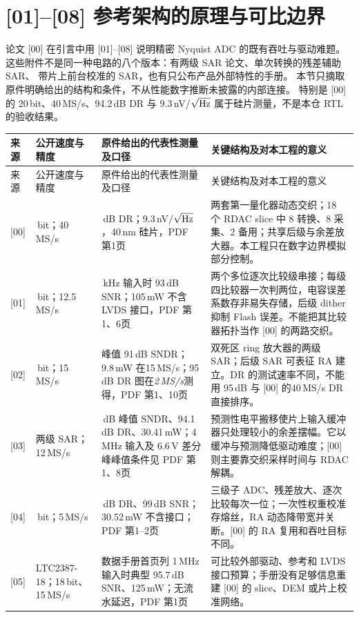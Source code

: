 \section{[01]--[08] 参考架构的原理与可比边界}
\label{sec:prior-art-comparison}
论文 [00] 在引言中用 [01]--[08] 说明精密 Nyquist ADC 的既有吞吐与驱动难题。
这些附件不是同一种电路的八个版本：有两级 SAR 论文、单次转换的残差辅助 SAR、
带片上前台校准的 SAR，也有只公布产品外部特性的手册。
本节只摘取原件明确给出的结构和条件，不从性能数字推断未披露的内部连接。
特别是 [00] 的 20\,bit、40\,MS/s、94.2\,dB DR 与 9.3\,nV/$\sqrt{\rm Hz}$
属于硅片测量，不是本仓 RTL 的验收结果。

\small
\begin{longtable}{>{\raggedright\arraybackslash}p{11mm}>{\raggedright\arraybackslash}p{32mm}>{\raggedright\arraybackslash}p{47mm}>{\raggedright\arraybackslash}p{58mm}}
\toprule 来源&公开速度与精度&原件给出的代表性测量及口径&关键结构及对本工程的意义\\\midrule\endfirsthead
\toprule 来源&公开速度与精度&原件给出的代表性测量及口径&关键结构及对本工程的意义\\\midrule\endhead
\mbox{[00]}&20\,bit；40\,MS/s&94.2\,dB DR；9.3\,nV/$\sqrt{\rm Hz}$，40\,nm 硅片，PDF 第1页&两套第一量化器动态交织；18 个 RDAC slice 中 8 转换、8 采集、2 备用；共享后级与余差放大器。本工程只在数字边界模拟部分控制。\tabularnewline
\mbox{[01]}&18\,bit；12.5\,MS/s&50\,kHz 输入时 93\,dB SNR；105\,mW 不含 LVDS 接口，PDF 第1、6页&两个多位逐次比较级串接；每级四比较器一次判两位，电容误差系数存非易失存储，后级 dither 抑制 Flash 误差。不能把其比较器拓扑当作 [00] 的两路交织。\tabularnewline
\mbox{[02]}&16\,bit；15\,MS/s&峰值 91\,dB SNDR；9.8\,mW 在15\,MS/s；95\,dB DR 图在\emph{2\,MS/s}测得，PDF 第1、10页&双死区 ring 放大器的两级 SAR；后级 SAR 可表征 RA 建立。DR 的测试速率不同，不能用 95\,dB 与 [00] 的40\,MS/s DR 直接排序。\tabularnewline
\mbox{[03]}&两级 SAR；12\,MS/s&91.3\,dB 峰值 SNDR、94.1\,dB DR、30.41\,mW；4\,MHz 输入及 6.6\,V 差分峰峰值条件见 PDF 第1、8页&预测性电平搬移使片上输入缓冲器只处理较小的余差摆幅。它以缓冲与预测降低驱动难度；[00] 则主要靠交织采样时间与 RDAC 解耦。\tabularnewline
\mbox{[04]}&18\,bit；5\,MS/s&100.2\,dB DR、99\,dB SNR；30.52\,mW 不含接口；PDF 第1--2页&三级子 ADC、残差放大、逐次比较每次一位；一次性权重校准存熔丝，RA 动态降带宽并关断。[00] 的 RA 复用和吞吐目标不同。\tabularnewline
\mbox{[05]}&LTC2387-18；18\,bit、15\,MS/s&数据手册首页列 1\,MHz 输入时典型 95.7\,dB SNR、125\,mW；无流水延迟，PDF 第1页&可比较外部驱动、参考和 LVDS 接口预算；手册没有足够信息重建 [00] 的 slice、DEM 或片上校准网络。\tabularnewline

\end{longtable}
